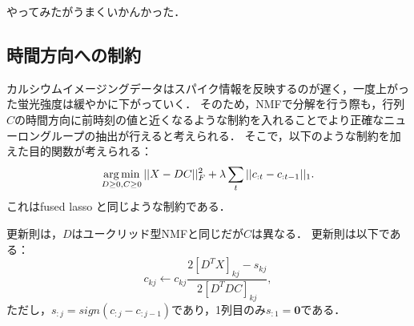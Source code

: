 やってみたがうまくいかんかった．

\subsection{時間方向への制約}
カルシウムイメージングデータはスパイク情報を反映するのが遅く，一度上がった蛍光強度は緩やかに下がっていく．
そのため，NMFで分解を行う際も，行列$C$の時間方向に前時刻の値と近くなるような制約を入れることでより正確なニューロングループの抽出が行えると考えられる．
そこで，以下のような制約を加えた目的関数が考えられる：
\begin{equation}
	\operatorname*{arg\,min}_{D \geq 0, C \geq 0}||X - DC||^2_F + \lambda \sum_t||c_{:t} - c_{:t-1}||_1.
  \label{eq:NMF-ar}
\end{equation}
これはfused lasso \cite{Tibshirani2005}と同じような制約である．

更新則は，$D$はユークリッド型NMFと同じだが$C$は異なる．
更新則は以下である：
\begin{equation}
	c_{kj} \leftarrow c_{kj} \frac{2[D^T X]_{kj} - s_{kj}}{2[D^T DC]_{kj}},
\end{equation}
ただし，$s_{:j} = sign(c_{:j} - c_{:j-1})$であり，1列目のみ$s_{:1} = \mathbf{0}$である．
